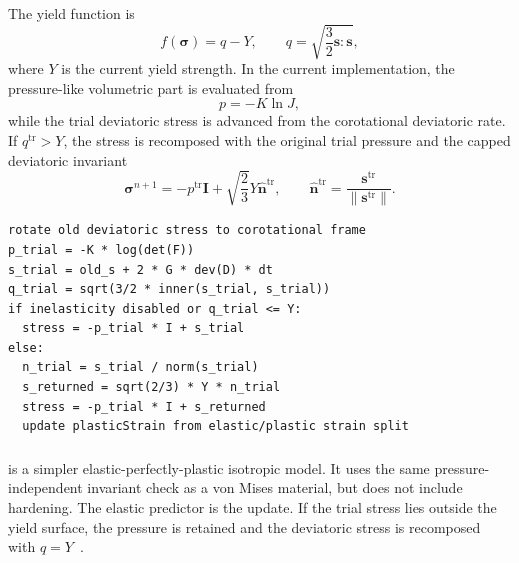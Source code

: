 The yield function is
\begin{equation}
  f(\boldsymbol{\sigma})=q-Y,
  \qquad
  q=\sqrt{\frac{3}{2}\mathbf{s}:\mathbf{s}},
  \label{eq:von-mises-yield}
\end{equation}
where \(Y\) is the current yield strength.  In the current implementation, the pressure-like volumetric part is evaluated from
\begin{equation}
  p = -K\ln J,
  \label{eq:von-mises-volumetric-pressure}
\end{equation}
while the trial deviatoric stress is advanced from the corotational deviatoric rate.  If \(q^{\mathrm{tr}}>Y\), the stress is recomposed with the original trial pressure and the capped deviatoric invariant
\begin{equation}
  \boldsymbol{\sigma}^{n+1}= -p^{\mathrm{tr}}\mathbf{I}
  + \sqrt{\frac{2}{3}}Y\widehat{\mathbf{n}}^{\mathrm{tr}},
  \qquad
  \widehat{\mathbf{n}}^{\mathrm{tr}}=\frac{\mathbf{s}^{\mathrm{tr}}}{\|\mathbf{s}^{\mathrm{tr}}\|}.
\end{equation}

\begin{lstlisting}[caption={VonMisesJ radial-return structure.},label={alg:von-mises-update},basicstyle=\ttfamily\small]
rotate old deviatoric stress to corotational frame
p_trial = -K * log(det(F))
s_trial = old_s + 2 * G * dev(D) * dt
q_trial = sqrt(3/2 * inner(s_trial, s_trial))
if inelasticity disabled or q_trial <= Y:
  stress = -p_trial * I + s_trial
else:
  n_trial = s_trial / norm(s_trial)
  s_returned = sqrt(2/3) * Y * n_trial
  stress = -p_trial * I + s_returned
  update plasticStrain from elastic/plastic strain split
\end{lstlisting}

\subsubsection{}
\label{subsubsec:perfectly-plastic-model}

 is a simpler elastic-perfectly-plastic isotropic model.  It uses the same pressure-independent invariant check as a von Mises material, but does not include hardening.  The elastic predictor is the  update.  If the trial stress lies outside the yield surface, the pressure is retained and the deviatoric stress is recomposed with \(q=Y\)~\cite{simo1998inelasticity}.

